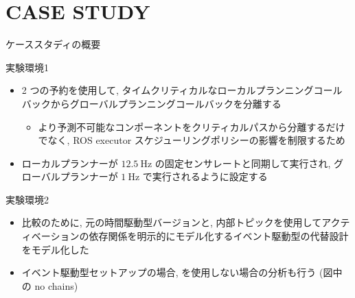 
\section{CASE STUDY}
\label{sec: case study}

\begin{frame}{ケーススタディの概要}
\end{frame}

\begin{frame}{実験環境1}
    \begin{itemize}
        \item 2 つの予約を使用して, タイムクリティカルなローカルプランニングコールバックからグローバルプランニングコールバックを分離する
              \begin{itemize}
                  \item より予測不可能なコンポーネントをクリティカルパスから分離するだけでなく, ROS executor スケジューリングポリシーの影響を制限するため
              \end{itemize}
        \item ローカルプランナーが $12.5 \mathrm{~Hz}$ の固定センサレートと同期して実行され, グローバルプランナーが $1 \mathrm{~Hz}$ で実行されるように設定する
    \end{itemize}
\end{frame}

\begin{frame}{実験環境2}
    \begin{itemize}
        \item 比較のために, 元の時間駆動型バージョンと, 内部トピックを使用してアクティベーションの依存関係を明示的にモデル化するイベント駆動型の代替設計をモデル化した
        \item イベント駆動型セットアップの場合,  を使用しない場合の分析も行う (図中の no chains)
    \end{itemize}
\end{frame}

